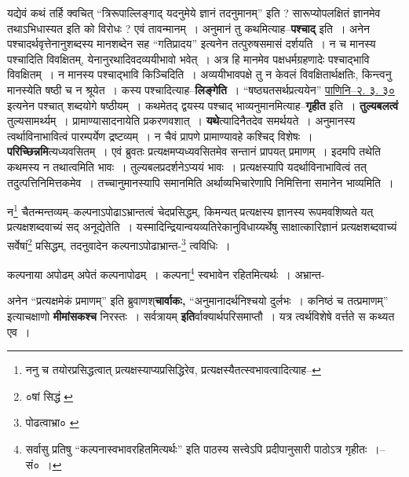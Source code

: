 \documentclass[article,12pt,a4paper]{memoir}
\begin{document}
	  \pstart यद्येवं कथं तर्हि क्वचित् “त्रिरूपाल्लिङ्गाद् यदनुमेये ज्ञानं तदनुमानम्” इति ? सारूप्योपलक्षितं ज्ञानमेव तथाऽभिधास्यत इति को विरोधः ? एवं तावन्मानम् । अनुमानं तु कथमित्याह--\textbf{पश्चाद्} इति । अनेन पश्चादर्थवृत्तेनानुशब्दस्य मानशब्देन सह “गतिप्रादय” इत्यनेन तत्पुरुषसमासं दर्शयति । न च मानस्य पश्चादिति \leavevmode{} विवक्षितम्, येनानुरथादिवदव्ययीभावो भवेत् । अत्र हि मानमेव पक्षधर्मग्रहणादेः पश्चाद्भावि विवक्षितम् । न मानस्य पश्चाद्भावि किञ्चिदिति । अव्ययीभावपक्षे तु न केवलं विवक्षितार्थक्षतिः, किन्त्वनु मानस्येति षष्ठी च न श्रूयेत । कस्य पश्चादित्याह--\textbf{लिङ्गेति} । “षष्ठ्यतसर्थप्रत्ययेन” \href{http://http://sarit.indology.info/?cref=Pā.2.3.30}{पाणिनि--२. ३. ३०} इत्यनेन पश्चात् शब्दयोगे षष्ठीयम् । कथमेतद् द्वयस्य पश्चाद् भाव्यनुमानमित्याह--\textbf{गृहीत} इति । \textbf{तुल्यबलत्वं} तुल्यसामर्थ्यम् । प्रामाण्यासादनायेति प्रकरणवशात् । \textbf{यथे}त्यादिनैतदेव समर्थयते । अनुमानस्य त्वर्थाविनाभावित्वं पारम्पर्येण द्रष्टव्यम् । न चैवं प्रापणे प्रामाण्यावहे कश्चिद् विशेषः । \textbf{परिच्छिन्नमि}त्यध्यवसितम् । एवं ब्रुवतः प्रत्यक्षमप्यध्यवसितमेव सन्तानं प्रापयत् प्रमाणम् । इदमपि तथेति कथमस्य न तथात्वमिति भावः । तुल्यबलप्रदर्शनेऽप्ययं भावः । प्रत्यक्षस्यापि यदर्थाविनाभावित्वं तत् तदुत्पत्तिनिमित्तकमेव । तच्चानुमानस्यापि समानमिति अर्थाव्यभिचारेणापि निमित्तिना समानेन भाव्यमिति ।
	\pend
	  \bigskip
	  \begingroup
	

	  \pstart न\footnote{ननु च तयोरप्रसिद्धत्वात् प्रत्यक्षस्याप्यप्रसिद्धिरेव, प्रत्यक्षस्यैतत्स्वभावत्वादित्याह--\cite{dp-msD-n}} चैतन्मन्तव्यम्--कल्पनाऽपोढाऽभ्रान्तत्वं चेदप्रसिद्धम्, किमन्यत् प्रत्यक्षस्य ज्ञानस्य रूपमवशिष्यते यत् प्रत्यक्षशब्दवाच्यं सद् अनूद्येतेति । यस्मादिन्द्रियान्वयव्यतिरेकानुविधाय्यर्थेषु साक्षात्कारिज्ञानं प्रत्यक्षशब्दवाच्यं सर्वेषां\footnote{०षां सिद्धं \cite{dp-msA} \cite{dp-msC} \cite{dp-edP} \cite{dp-edH} \cite{dp-edE}} प्रसिद्धम्, तदनुवादेन कल्पनाऽपोढाभ्रान्त-\footnote{पोढत्वाभ्रा० \cite{dp-msC} \cite{dp-msD}} त्वविधिः ।
	\pend
       

	  \pstart कल्पनाया अपोढम् अपेतं कल्पनापोढम् । कल्पना\footnote{सर्वासु प्रतिषु “कल्पनास्वभावरहितमित्यर्थः” इति पाठस्य सत्त्वेऽपि प्रदीपानुसारी पाठोऽत्र गृहीतः ।--सं० ।} स्वभावेन रहितमित्यर्थः । अभ्रान्त-
	\pend
      
	  \endgroup
	

	  \pstart अनेन “प्रत्यक्षमेकं प्रमाणम्” इति ब्रुवाणश्\textbf{चार्वाकः,} “अनुमानादर्थनिश्चयो दुर्लभः । कनिष्ठं च तत्प्रमाणम्” इत्याचक्षाणो \textbf{मीमांसकश्च} निरस्तः । सर्वत्रायम् \textbf{इति}र्वाक्यार्थपरिसमाप्तौ । यत्र त्वर्थविशेषे वर्त्तते स कथ्यत एव ।
	\pend
      
\end{document}
